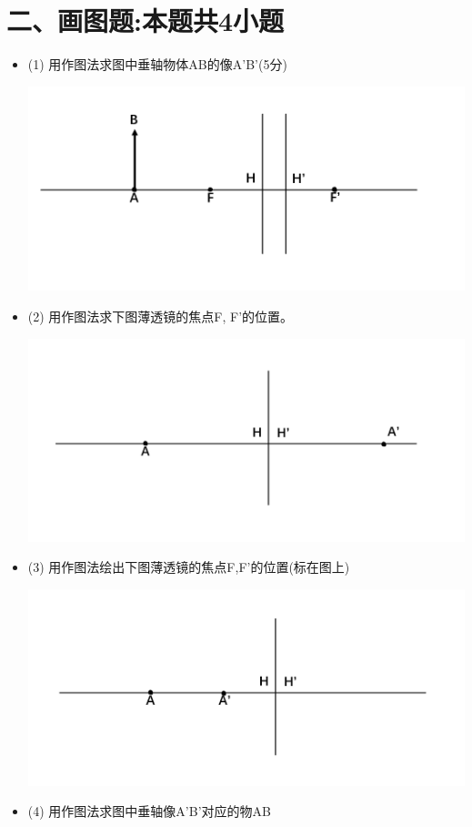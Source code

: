 \documentclass[11pt,a4paper]{article}
\begin{document}
    \section*{二、画图题:本题共4小题}
    \begin{itemize}
        \item (1) 用作图法求图中垂轴物体AB的像A'B'(5分)
        
        \includegraphics[scale=0.2]{1.png}%
        \vspace{10mm}
        \item (2) 用作图法求下图薄透镜的焦点F, F'的位置。
         
        \includegraphics[scale=0.2]{2.png}%
        \vspace{20mm}
        \item (3) 用作图法绘出下图薄透镜的焦点F,F'的位置(标在图上)
        
        \includegraphics[scale=0.2]{3.png}%
        \vspace{20mm}
        \item (4) 用作图法求图中垂轴像A'B'对应的物AB
        

\end{itemize}
\end{document}
